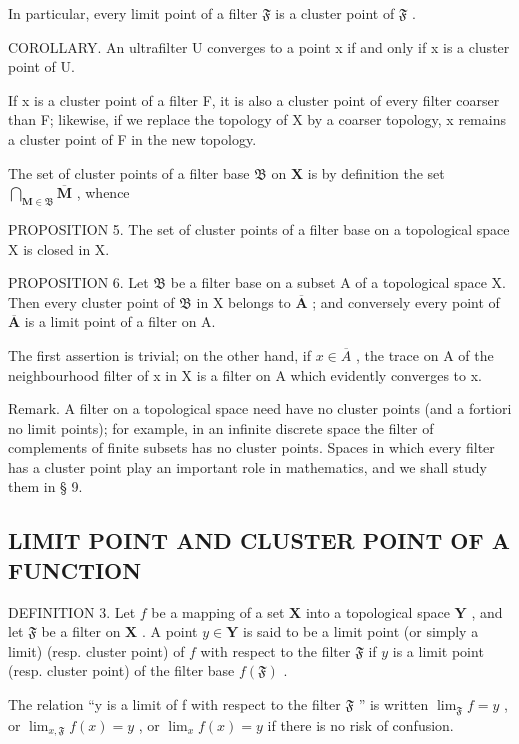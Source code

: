 In particular, every limit point of a filter \(\mathfrak{F}\) is a cluster point of \(\mathfrak{F}\) .

COROLLARY. An ultrafilter U converges to a point x if and only if x is a cluster point of U.

If x is a cluster point of a filter F, it is also a cluster point of every filter coarser than F; likewise, if we replace the topology of X by a coarser topology, x remains a cluster point of F in the new topology.

The set of cluster points of a filter base \(\mathfrak{B}\) on \(\mathbf{X}\) is by definition the set \(\bigcap_{\mathbf{M} \in \mathfrak{B}} \overline{\mathbf{M}}\) , whence

PROPOSITION 5. The set of cluster points of a filter base on a topological space X is closed in X.

PROPOSITION 6. Let \(\mathfrak{B}\) be a filter base on a subset A of a topological space X. Then every cluster point of \(\mathfrak{B}\) in X belongs to \(\overline{\mathbf{A}}\) ; and conversely every point of \(\overline{\mathbf{A}}\) is a limit point of a filter on A.

The first assertion is trivial; on the other hand, if \(x \in \overline{A}\) , the trace on A of the neighbourhood filter of x in X is a filter on A which evidently converges to x.

Remark. A filter on a topological space need have no cluster points (and a fortiori no limit points); for example, in an infinite discrete space the filter of complements of finite subsets has no cluster points. Spaces in which every filter has a cluster point play an important role in mathematics, and we shall study them in § 9.

\subsection{LIMIT POINT AND CLUSTER POINT OF A FUNCTION}

DEFINITION 3. Let \(f\) be a mapping of a set \(\mathbf{X}\) into a topological space \(\mathbf{Y}\) , and let \(\mathfrak{F}\) be a filter on \(\mathbf{X}\) . A point \(y \in \mathbf{Y}\) is said to be a limit point (or simply a limit) (resp. cluster point) of \(f\) with respect to the filter \(\mathfrak{F}\) if \(y\) is a limit point (resp. cluster point) of the filter base \(f(\mathfrak{F})\) .

The relation ``y is a limit of f with respect to the filter \(\mathfrak{F}\) '' is written \(\lim_{\mathfrak{F}} f = y\) , or \(\lim_{x, \mathfrak{F}} f(x) = y\) , or \(\lim_{x} f(x) = y\) if there is no risk of confusion.


